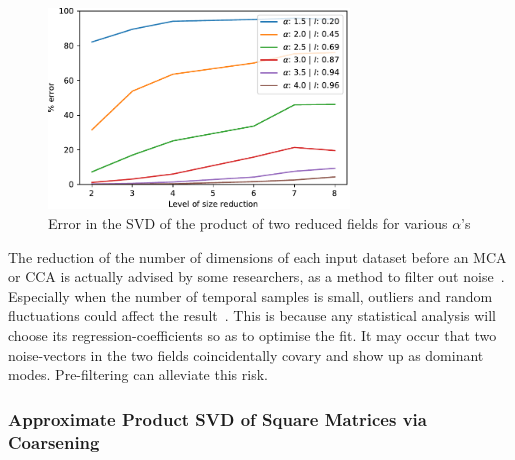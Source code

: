 \documentclass[ijgi,article,submit,moreauthors,pdftex,10pt,a4paper]{Definitions/mdpi}
\begin{document}
\begin{figure}[H]
\centering
\includegraphics[width=80mm]{Results/plotRandomisedSizeReducedMatrixProduct.pdf}
\caption[Error after reduction]{Error in the SVD of the product of two reduced fields for various $\alpha$'s}
\label{fig:plotRandomisedSizeReducedMatrixProduct}
\end{figure}

The reduction of the number of dimensions of each input dataset before an MCA or CCA is actually advised by some researchers, as a method to filter out noise~\cite{Barnett1987}. Especially when the number of temporal samples is small, outliers and random fluctuations could affect the result~\cite{Bretherton1992}. This is because any statistical analysis will choose its regression-coefficients so as to optimise the fit. It may occur that two noise-vectors in the two fields coincidentally covary and show up as dominant modes. Pre-filtering can alleviate this risk.

\subsubsection{Approximate Product SVD of Square Matrices via Coarsening}
\label{sec:Results/Approximate Product SVD of Square Matrices via Coarsening}
\end{document}
